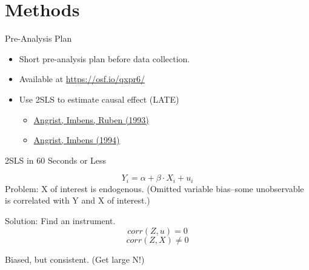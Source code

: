 \documentclass{beamer}
\begin{document}
{ %
    \begin{frame}[plain]
     \end{frame}
}
\section{Methods}
\begin{frame}{Pre-Analysis Plan}

\begin{itemize}
\item Short pre-analysis plan before data collection.
\item Available at \url{https://osf.io/qxpr6/}
\item Use 2SLS to estimate causal effect (LATE)
\begin{itemize}
\item \href{http://www.tandfonline.com/doi/abs/10.1080/01621459.1996.10476902}{Angrist, Imbens, Ruben (1993)}
\item  \href{http://www.nber.org/papers/t0118}{Angrist, Imbens (1994)}
\end{itemize} 
\end{itemize}
\end{frame}

\begin{frame}{2SLS in 60 Seconds or Less}

$$Y_i=\alpha + \beta \cdot X_i+u_i$$
Problem: X of interest is endogenous. (Omitted variable bias--some unobservable is correlated with Y and X of interest.)

\vspace{0.25in}
Solution: Find an instrument. 
$$corr(Z,u)=0$$
$$corr(Z,X)\neq 0$$

Biased, but consistent. (Get large N!)
\end{frame}
\end{document}

